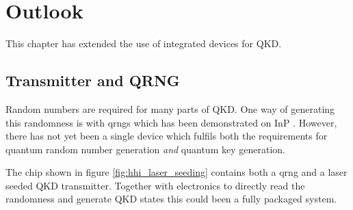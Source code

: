 \section{Outlook}

This chapter has extended the use of integrated devices for \acl{QKD}.

\subsection{Transmitter and QRNG}

Random numbers are required for many parts of \ac{QKD}. One way of generating this randomness is with \acp{qrng} which has been demonstrated on \ac{InP} \cite{FrancescoThesis,Abellan2016}. However, there has not yet been a single device which fulfils both the requirements for quantum random number generation \textit{and} quantum key generation.

The chip shown in figure \ref{fig:hhi_laser_seeding} contains both a \ac{qrng} and a laser seeded \ac{QKD} transmitter. Together with electronics to directly read the randomness and generate \ac{QKD} states this could been a fully packaged system.

